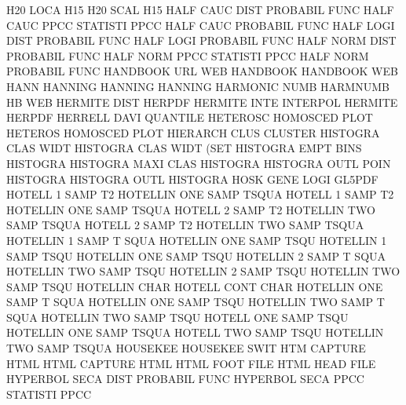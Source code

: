 H20      LOCA                           H15
H20      SCAL                           H15
HALF     CAUC DIST                      PROBABIL FUNC
HALF     CAUC PPCC                      STATISTI PPCC
HALF     CAUC                           PROBABIL FUNC
HALF     LOGI DIST                      PROBABIL FUNC
HALF     LOGI                           PROBABIL FUNC
HALF     NORM DIST                      PROBABIL FUNC
HALF     NORM PPCC                      STATISTI PPCC
HALF     NORM                           PROBABIL FUNC
HANDBOOK URL                            WEB      HANDBOOK
HANDBOOK                                WEB
HANN                                    HANNING
HANNING                                 HANNING
HARMONIC NUMB                           HARMNUMB
HB                                      WEB
HERMITE  DIST                           HERPDF
HERMITE  INTE                           INTERPOL
HERMITE                                 HERPDF
HERRELL  DAVI                           QUANTILE
HETEROSC                                HOMOSCED PLOT
HETEROS                                 HOMOSCED PLOT
HIERARCH CLUS                           CLUSTER
HISTOGRA CLAS WIDT                      HISTOGRA CLAS WIDT (SET
HISTOGRA EMPT BINS                      HISTOGRA
HISTOGRA MAXI CLAS                      HISTOGRA
HISTOGRA OUTL POIN                      HISTOGRA
HISTOGRA OUTL                           HISTOGRA
HOSK     GENE LOGI                      GL5PDF
HOTELL   1    SAMP T2                   HOTELLIN ONE  SAMP TSQUA
HOTELL   1    SAMP T2                   HOTELLIN ONE  SAMP TSQUA
HOTELL   2    SAMP T2                   HOTELLIN TWO  SAMP TSQUA
HOTELL   2    SAMP T2                   HOTELLIN TWO  SAMP TSQUA
HOTELLIN 1    SAMP T    SQUA            HOTELLIN ONE  SAMP TSQU
HOTELLIN 1    SAMP TSQU                 HOTELLIN ONE  SAMP TSQU
HOTELLIN 2    SAMP T    SQUA            HOTELLIN TWO  SAMP TSQU
HOTELLIN 2    SAMP TSQU                 HOTELLIN TWO  SAMP TSQU
HOTELLIN CHAR                           HOTELL   CONT CHAR
HOTELLIN ONE  SAMP T    SQUA            HOTELLIN ONE  SAMP TSQU
HOTELLIN TWO  SAMP T    SQUA            HOTELLIN TWO  SAMP TSQU
HOTELL   ONE  SAMP TSQU                 HOTELLIN ONE  SAMP TSQUA
HOTELL   TWO  SAMP TSQU                 HOTELLIN TWO  SAMP TSQUA
HOUSEKEE                                HOUSEKEE SWIT
HTM                                     CAPTURE  HTML
HTML                                    CAPTURE  HTML
HTML     FOOT FILE                      HTML     HEAD FILE
HYPERBOL SECA DIST                      PROBABIL FUNC
HYPERBOL SECA PPCC                      STATISTI PPCC
